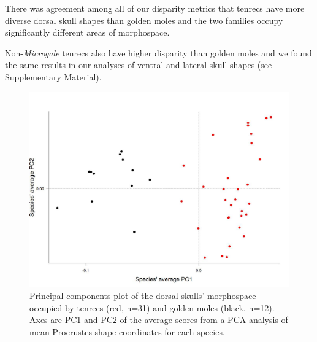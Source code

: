 \documentclass[12pt,a4paper]{article}
\begin{document}
There was agreement among all of our disparity metrics that tenrecs have more diverse dorsal skull shapes than golden moles
and the two families occupy significantly different areas of morphospace.

Non-\textit{Microgale} tenrecs also have higher disparity than golden moles and we found the same results in our analyses of ventral and lateral skull shapes (see Supplementary Material).




	
\begin{figure}[H]
\centering
\includegraphics[width=1\linewidth]{figures/SkDors_Tenrecs+Gmoles_PC1PC2_01_05.jpg}
\caption{Principal components plot of the dorsal skulls' morphospace occupied by tenrecs (red, n=31) and golden moles (black, n=12). Axes are PC1 and PC2 of the average scores from a PCA analysis of mean Procrustes shape coordinates for each species. }
\label{skdorsPCA}
\end{figure}
\end{document}
